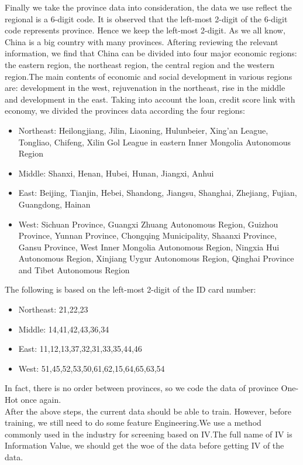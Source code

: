 \documentclass{mcmthesis}
\begin{document}
Finally we take the province data into consideration, the data we use reflect the regional is a 6-digit code. It is observed that the left-most 2-digit of the 6-digit code  represents province. Hence we keep the left-most 2-digit. As we all know, China is a big country with many provinces. Aftering reviewing the relevant information, we find that China can be divided into four major economic regions: the eastern region, the northeast region, the central region and the western region.The main contents of economic and social development in various regions are: development in the west, rejuvenation in the northeast, rise in the middle and development in the east. Taking into account the loan, credit score link with economy, we divided the provinces data according the four regions:
\begin{itemize}
  \item Northeast: Heilongjiang, Jilin, Liaoning, Hulunbeier, Xing'an League, Tongliao, Chifeng, Xilin Gol League in eastern Inner Mongolia Autonomous Region
  \item Middle: Shanxi, Henan, Hubei, Hunan, Jiangxi, Anhui
  \item East: Beijing, Tianjin, Hebei, Shandong, Jiangsu, Shanghai, Zhejiang, Fujian, Guangdong, Hainan 
  \item West: Sichuan Province, Guangxi Zhuang Autonomous Region, Guizhou Province, Yunnan Province, Chongqing Municipality, Shaanxi Province, Gansu Province, West Inner Mongolia Autonomous Region, Ningxia Hui Autonomous Region, Xinjiang Uygur Autonomous Region, Qinghai Province and Tibet Autonomous Region
\end{itemize}

The following is based on the left-most 2-digit of the ID card number:

\begin{itemize}
  \item Northeast: 21,22,23
  \item Middle: 14,41,42,43,36,34
  \item East: 11,12,13,37,32,31,33,35,44,46  
  \item West: 51,45,52,53,50,61,62,15,64,65,63,54
\end{itemize}

In fact, there is no order between provinces, so we code the data of province One-Hot once again.
\newline
\\

After the above steps, the current data should be able to train. However, before training, we still need to do some feature Engineering.We use a method commonly used in the industry for screening based on IV.The full name of IV is Information Value, we should get the woe of the data before getting IV of the data.
\end{document}
